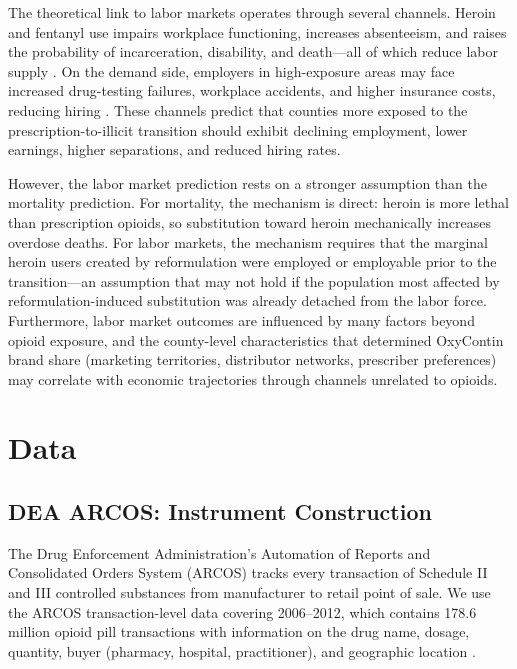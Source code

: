 \documentclass[12pt]{article}
\begin{document}
The theoretical link to labor markets operates through several channels. Heroin and fentanyl use impairs workplace functioning, increases absenteeism, and raises the probability of incarceration, disability, and death---all of which reduce labor supply \citep{savych2019, maclean2020}. On the demand side, employers in high-exposure areas may face increased drug-testing failures, workplace accidents, and higher insurance costs, reducing hiring \citep{doleac2019}. These channels predict that counties more exposed to the prescription-to-illicit transition should exhibit declining employment, lower earnings, higher separations, and reduced hiring rates.

However, the labor market prediction rests on a stronger assumption than the mortality prediction. For mortality, the mechanism is direct: heroin is more lethal than prescription opioids, so substitution toward heroin mechanically increases overdose deaths. For labor markets, the mechanism requires that the marginal heroin users created by reformulation were employed or employable prior to the transition---an assumption that may not hold if the population most affected by reformulation-induced substitution was already detached from the labor force. Furthermore, labor market outcomes are influenced by many factors beyond opioid exposure, and the county-level characteristics that determined OxyContin brand share (marketing territories, distributor networks, prescriber preferences) may correlate with economic trajectories through channels unrelated to opioids.


\section{Data}
\label{sec:data}

\subsection{DEA ARCOS: Instrument Construction}

The Drug Enforcement Administration's Automation of Reports and Consolidated Orders System (ARCOS) tracks every transaction of Schedule II and III controlled substances from manufacturer to retail point of sale. We use the ARCOS transaction-level data covering 2006--2012, which contains 178.6 million opioid pill transactions with information on the drug name, dosage, quantity, buyer (pharmacy, hospital, practitioner), and geographic location \citep{arcos2019}.
\end{document}
